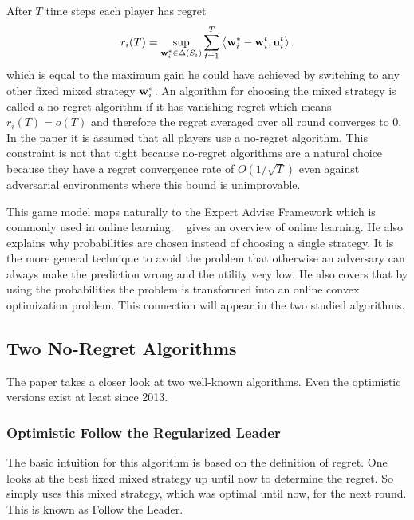 \documentclass[a4paper]{article}
\theoremstyle{definition}
\renewcommand{\vec}[1]{\ensuremath{{\bf #1}}}
\newcommand{\dotp}[2]{\ensuremath{\left\langle #1, #2 \right\rangle}}
\begin{document}
After $T$ time steps each player has regret 
\begin{equation*}
r_i(T)
= \sup_{\vec{w}_i^*\in \Delta(S_i)} \sum_{t=1}^{T} \dotp{\vec{w}_i^*-\vec{w}_i^t}{ \vec{u}_i^t}. 
\end{equation*}
which is equal to the maximum gain he could have achieved by
switching to any other fixed mixed strategy $\vec{w}_i^*$.
An algorithm for choosing the mixed strategy is called a no-regret algorithm if it has vanishing
regret which means $r_i(T) = o(T)$ and therefore the regret averaged
over all round converges to 0.
In the paper it is assumed that all players use a no-regret algorithm.
This constraint is not that tight because no-regret algorithms are a
natural choice because they have a regret convergence rate of $O(1/\sqrt{T})$ even
against adversarial environments where this bound is unimprovable.


This game model maps naturally to the Expert Advise Framework which is
commonly used in online learning.
\citeauthor[]{Foundations}~\cite{Foundations} gives an overview of online learning.
He also explains why probabilities are chosen instead of choosing a
single strategy.
It is the more general technique to avoid the problem that otherwise
an adversary can always make the prediction wrong and the utility very
low.
He also covers that by using the probabilities the problem is
transformed into an online convex optimization problem.
This connection will appear in the two studied algorithms.



\subsection{Two No-Regret Algorithms}
\label{sec:two-no-regret}

The paper takes a closer look at two well-known algorithms.
Even the optimistic versions exist at least since 2013.

\subsubsection{Optimistic Follow the Regularized Leader}
\label{sec:optim-foll-regul}
The basic intuition for this algorithm is based on the definition of
regret.
One looks at the best fixed mixed strategy up until now to determine
the regret.
So simply uses this mixed strategy, which was optimal until now, for
the next round. This is known as Follow the Leader.
\end{document}
